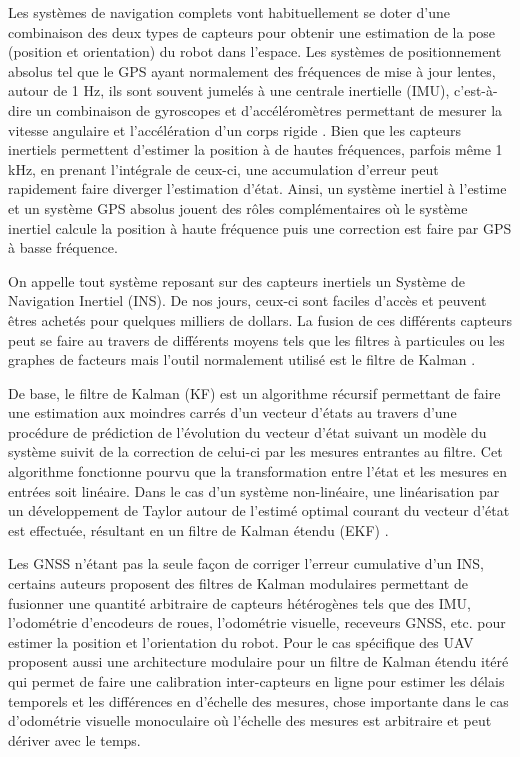 Les systèmes de navigation complets vont habituellement se doter d'une combinaison des deux types de capteurs pour obtenir une estimation de la pose (position et orientation) du robot dans l'espace. Les systèmes de positionnement absolus tel que le GPS ayant normalement des fréquences de mise à jour lentes, autour de 1 Hz, ils sont souvent jumelés à une centrale inertielle (IMU), c'est-à-dire un combinaison de gyroscopes et d'accéléromètres permettant de mesurer la vitesse angulaire et l'accélération d'un corps rigide \citep{Noureldin2013}. Bien que les capteurs inertiels permettent d'estimer la position à de hautes fréquences, parfois même 1 kHz, en prenant l'intégrale de ceux-ci, une accumulation d'erreur peut rapidement faire diverger l'estimation d'état. Ainsi, un système inertiel à l'estime et un système GPS absolus jouent des rôles complémentaires où le système inertiel calcule la position à haute fréquence puis une correction est faire par GPS à basse fréquence.

On appelle tout système reposant sur des capteurs inertiels un Système de Navigation Inertiel (INS). De nos jours, ceux-ci sont faciles d'accès et peuvent êtres achetés pour quelques milliers de dollars. La fusion de ces différents capteurs peut se faire au travers de différents moyens tels que les filtres à particules \citep{Carvalho1997} ou les graphes de facteurs \citep{Indelman2012} mais l'outil normalement utilisé est le filtre de Kalman \citep{Noureldin2013}.

De base, le filtre de Kalman (KF) est un algorithme récursif permettant de faire une estimation aux moindres carrés d'un vecteur d'états au travers d'une procédure de prédiction de l'évolution du vecteur d'état suivant un modèle du système suivit de la correction de celui-ci par les mesures entrantes au filtre. Cet algorithme fonctionne pourvu que la transformation entre l'état et les mesures en entrées soit linéaire. Dans le cas d'un système non-linéaire, une linéarisation par un développement de Taylor autour de l'estimé optimal courant du vecteur d'état est effectuée, résultant en un filtre de Kalman étendu (EKF) \citep{Chui2017}.

Les GNSS n'étant pas la seule façon de corriger l'erreur cumulative d'un INS, certains auteurs proposent des filtres de Kalman modulaires permettant de fusionner une quantité arbitraire de capteurs hétérogènes tels que des IMU, l'odométrie d'encodeurs de roues, l'odométrie visuelle, receveurs GNSS, etc. \citep{MooreEkf2014} pour estimer la position et l'orientation du robot. Pour le cas spécifique des UAV \citep{Lynen2013} proposent aussi une architecture modulaire pour un filtre de Kalman étendu itéré qui permet de faire une calibration inter-capteurs en ligne pour estimer les délais temporels et les différences en d'échelle des mesures, chose importante dans le cas d'odométrie visuelle monoculaire où l'échelle des mesures est arbitraire et peut dériver avec le temps.

